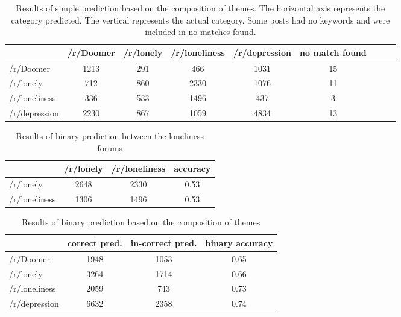 \documentclass[../report.tex]{subfiles}
\begin{document}
\begin{table*}[ht]
    \centering
   \begin{tabular}{| l | c | c |c | c | c | c | c | c |}
    \toprule
    {} & /r/Doomer & /r/lonely & /r/loneliness & /r/depression & no match found \\ 
    \midrule
/r/Doomer & 1213 & 291 & 466 & 1031 & 15 \\ 
/r/lonely & 712 & 860 & 2330 & 1076 & 11 \\ 
/r/loneliness & 336 & 533 & 1496 & 437   & 3 \\
/r/depression & 2230 & 867 & 1059 & 4834 &  13 \\
    \bottomrule
   \end{tabular} 

   \caption{Results of simple prediction based on the composition of themes. The horizontal axis represents the category predicted. The vertical represents the actual category. Some posts had no keywords and were included in no matches found.}
   \label{tab:pred_results}
\end{table*}

\begin{table*}[ht]
    \centering
   \begin{tabular}{| l | c | c |c |}
    \toprule
    {} & /r/lonely & /r/loneliness & accuracy \\ 
    \midrule
/r/lonely & 2648 & 2330 & 0.53 \\
/r/loneliness & 1306 & 1496 & 0.53 \\
    \bottomrule
   \end{tabular}

   \caption{Results of binary prediction between the loneliness forums}
   \label{tab:loneliness_pred_results}
\end{table*}

\begin{table}[H]
    \centering
   \begin{tabular}{| l | c | c |c |}
    \toprule
    {} & \multicolumn{1}{p{1cm}|}{correct pred.} & \multicolumn{1}{p{1cm}|}{in-correct pred.} & \multicolumn{1}{p{1cm}|}{binary accuracy} \\
    \midrule
 /r/Doomer & 1948 & 1053 & 0.65\\ 
 /r/lonely & 3264 & 1714 & 0.66\\ 
/r/loneliness & 2059 & 743 & 0.73\\
/r/depression & 6632 & 2358 & 0.74 \\
    \bottomrule
   \end{tabular}

   \caption{Results of binary prediction based on the composition of themes}
   \label{tab:binary_pred_results}
\end{table}
\end{document}

